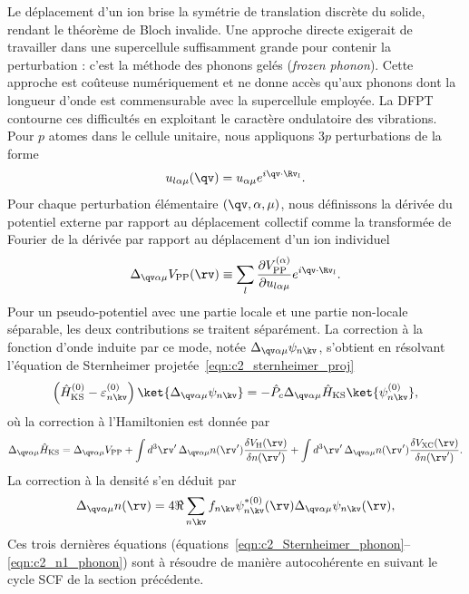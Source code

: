 Le déplacement d'un ion brise la symétrie de translation discrète du solide, rendant le théorème de Bloch invalide. Une approche directe exigerait de travailler dans une supercellule suffisamment grande pour contenir la perturbation : c'est la méthode des phonons gelés (\emph{frozen phonon}). Cette approche est coûteuse numériquement et ne donne accès qu'aux phonons dont la longueur d'onde est commensurable avec la supercellule employée. La DFPT contourne ces difficultés en exploitant le caractère ondulatoire des vibrations. Pour $p$ atomes dans le cellule unitaire, nous appliquons $3p$ perturbations de la forme
\begin{equation}
    u_{l\alpha\mu}(\qv)=u_{\alpha\mu}e^{i\qv\cdot \Rv_l}.
\end{equation}
Pour chaque perturbation élémentaire $(\qv,\alpha,\mu)$, nous définissons la dérivée du potentiel externe par rapport au déplacement collectif comme la transformée de Fourier de la dérivée par rapport au déplacement d'un ion individuel
\begin{equation}
    \Delta_{\qv\alpha\mu}V_\text{PP}(\rv)\equiv\sum_{l}\frac{\partial V_\text{PP}^{(\alpha)}}{\partial u_{l\alpha\mu}}e^{i\qv\cdot\Rv_l}.
\end{equation}
Pour un pseudo-potentiel avec une partie locale et une partie non-locale séparable, les deux contributions se traitent séparément. La correction à la fonction d'onde induite par ce mode, notée $\Delta_{\qv\alpha\mu}\psi_{n\kv}$, s'obtient en résolvant l'équation de Sternheimer projetée~\eqref{eqn:c2_sternheimer_proj}
\begin{equation}
    \left(\hat{H}^{(0)}_\text{KS}-\varepsilon_{n\kv}^{(0)}\right)\ket{\Delta_{\qv\alpha\mu}\psi_{n\kv}}=-\hat{P}_c\Delta_{\qv\alpha\mu}\hat{H}_\text{KS}\ket{\psi_{n\kv}^{(0)}},
    \label{eqn:c2_Sternheimer_phonon}
\end{equation}
où la correction à l'Hamiltonien est donnée par 
\begin{equation}
    \Delta_{\qv\alpha\mu}\hat{H}_\text{KS} =\Delta_{\qv\alpha\mu} V_\text{PP}+\int d^3\rv'\,\Delta_{\qv\alpha\mu}n(\rv')\frac{\delta V_\text{H}(\rv)}{\delta n(\rv')}+\int d^3\rv'\,\Delta_{\qv\alpha\mu}n(\rv')\frac{\delta V_\text{XC}(\rv)}{\delta n(\rv')}.
    \label{eqn:c2_H1_phonon}
\end{equation}
La correction à la densité s'en déduit par
\begin{equation}
    \Delta_{\qv\alpha\mu}n(\rv)=4\Re\sum_{n\kv}f_{n\kv}\psi^{*(0)}_{n\kv}(\rv)\Delta_{\qv\alpha\mu}\psi_{n\kv}(\rv),
    \label{eqn:c2_n1_phonon}
\end{equation}
Ces trois dernières équations (équations~\eqref{eqn:c2_Sternheimer_phonon}--\eqref{eqn:c2_n1_phonon}) sont à résoudre de manière autocohérente en suivant le cycle SCF de la section précédente.

